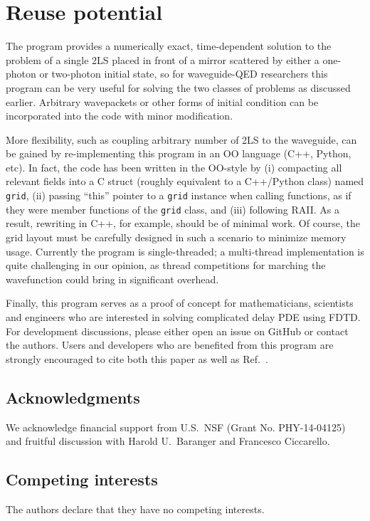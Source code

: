 \documentclass[12pt,letter,onecolumn,notitlepage]{article}
\begin{document}
\section{Reuse potential}
The program provides a numerically exact, time-dependent solution to the problem of a single 2LS placed in front of a mirror scattered by either a one-photon or two-photon initial state, so for waveguide-QED researchers this program can be very useful for solving the two classes of problems as discussed earlier. Arbitrary wavepackets or other forms of initial condition can be incorporated into the code with minor modification. 

More flexibility, such as coupling arbitrary number of 2LS to the waveguide, can be gained by re-implementing this program in an OO language (C++, Python, etc). In fact, the code has been written in the OO-style by (i) compacting all relevant fields into a C struct (roughly equivalent to a C++/Python class) named \texttt{grid}, (ii) passing ``this'' pointer to a \texttt{grid} instance when calling functions, as if they were member functions of the \texttt{grid} class, and (iii) following RAII. As a result, rewriting in C++, for example, should be of minimal work. Of course, the grid layout must be carefully designed in such a scenario to minimize memory usage. Currently the program is single-threaded; a multi-thread implementation is quite challenging in our opinion, as thread competitions for marching the wavefunction could bring in significant overhead.

Finally, this program serves as a proof of concept for mathematicians, scientists and engineers who are interested in solving complicated delay PDE using FDTD. For development discussions, please either open an issue on GitHub or contact the authors. Users and developers who are benefited from this program are strongly encouraged to cite both this paper as well as Ref.~\cite{FangNM17}.

\subsection{Acknowledgments}
	We acknowledge financial support from U.S.\ NSF (Grant No. PHY-14-04125) and fruitful discussion with Harold U.\ Baranger and Francesco Ciccarello.

\subsection{Competing interests}
The authors declare that they have no competing interests.
\end{document}
